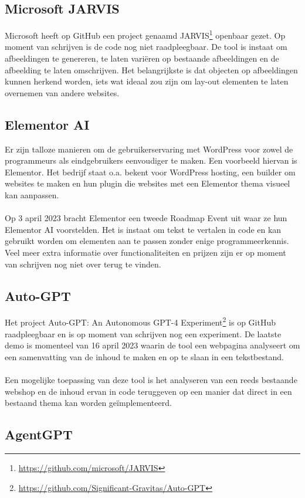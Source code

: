 \subsection{Microsoft JARVIS}
Microsoft heeft op GitHub een project genaamd JARVIS\footnote{\href{https://github.com/microsoft/JARVIS}{https://github.com/microsoft/JARVIS}} openbaar gezet. Op moment van schrijven is de code nog niet raadpleegbaar. De tool is instaat om afbeeldingen te genereren, te laten variëren op bestaande afbeeldingen en de afbeelding te laten omschrijven. Het belangrijkste is dat objecten op afbeeldingen kunnen herkend worden, iets wat ideaal zou zijn om lay-out elementen te laten overnemen van andere websites.
\label{elementor_ai_hoofdstuk}\subsection{Elementor AI}
Er zijn talloze manieren om de gebruikerservaring met WordPress voor zowel de programmeurs als eindgebruikers eenvoudiger te maken. Een voorbeeld hiervan is Elementor. Het bedrijf staat o.a. bekent voor WordPress hosting, een builder om websites te maken en hun plugin die websites met een Elementor thema visueel kan aanpassen.
\\\\
Op 3 april 2023 bracht Elementor een tweede Roadmap Event \autocite{Laster2023} uit waar ze hun Elementor AI voorstelden. Het is instaat om tekst te vertalen in code en kan gebruikt worden om elementen aan te passen zonder enige programmeerkennis. Veel meer extra informatie over functionaliteiten en prijzen zijn er op moment van schrijven nog niet over terug te vinden.
\label{auto_gpt}\subsection{Auto-GPT}
Het project Auto-GPT: An Autonomous GPT-4 Experiment\footnote{\href{https://github.com/Significant-Gravitas/Auto-GPT}{https://github.com/Significant-Gravitas/Auto-GPT}} is op GitHub raadpleegbaar en is op moment van schrijven nog een experiment. De laatste demo is momenteel van 16 april 2023 waarin de tool een webpagina analyseert om een samenvatting van de inhoud te maken en op te slaan in een tekstbestand.
\\\\
Een mogelijke toepassing van deze tool is het analyseren van een reeds bestaande webshop en de inhoud ervan in code teruggeven op een manier dat direct in een bestaand thema kan worden geïmplementeerd.
\label{agentgpt}\subsection{AgentGPT} 
